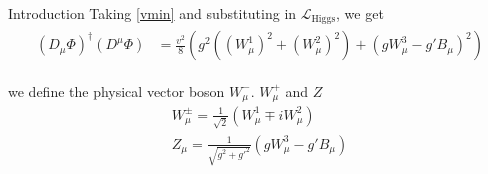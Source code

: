 \begin{chapter}{Introduction}
Taking \ref{vmin} and substituting in $\mathcal{L}_\text{Higgs}$, we get 
\begin{align}\label{W}
\begin{split}
(D_\mu \Phi)^\dagger (D^\mu \Phi)& =\frac{v^2}{8} \left(g^2 ((W^1_\mu)^2 +(W^2_\mu)^2 )+( gW^3_\mu -g'B_\mu)^2 \right)
\end{split}
\end{align}

we define the physical vector boson $W^-_\mu$. $W^+_\mu$ and $Z$ 
\begin{align} 
W^{\pm}_\mu=\frac{1}{\sqrt{2}} (W^1_\mu \mp iW^2_\mu) \label{smo}\\ 
Z_\mu=\frac{1}{\sqrt{g^2+g'^2}}\left(gW^3_\mu -g'B_\mu   \right) \label{zboson}
\end{align}



\end{chapter}
